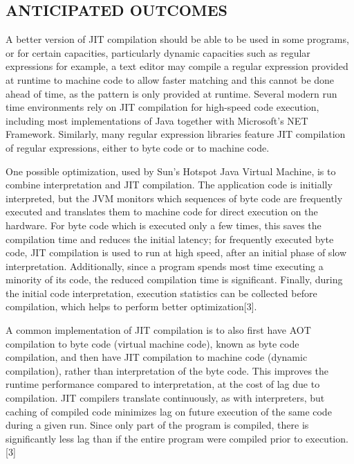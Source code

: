 \documentclass{article}
\begin{document}
\subsection{ANTICIPATED OUTCOMES}{A better version of JIT compilation should be able to be used in some programs, or for certain capacities, particularly dynamic capacities such as regular expressions for example, a text editor may compile a regular expression provided at runtime to machine code to allow faster matching and this cannot be done ahead of time, as the pattern is only provided at runtime. Several modern run time environments rely on JIT compilation for high-speed code execution, including most implementations of Java together with Microsoft’s NET Framework. Similarly, many regular expression libraries feature JIT compilation of regular expressions, either to byte code or to machine code.
 
One possible optimization, used by Sun's Hotspot Java Virtual Machine, is to combine interpretation and JIT compilation. The application code is initially interpreted, but the JVM monitors which sequences of byte code are frequently executed and translates them to machine code for direct execution on the hardware. For byte code which is executed only a few times, this saves the compilation time and reduces the initial latency; for frequently executed byte code, JIT compilation is used to run at high speed, after an initial phase of slow interpretation. Additionally, since a program spends most time executing a minority of its code, the reduced compilation time is significant. Finally, during the initial code interpretation, execution statistics can be collected before compilation, which helps to perform better optimization[3].
 
A common implementation of JIT compilation is to also first have AOT compilation to byte code (virtual machine code), known as byte code compilation, and then have JIT compilation to machine code (dynamic compilation), rather than interpretation of the byte code. This improves the runtime performance compared to interpretation, at the cost of lag due to compilation. JIT compilers translate continuously, as with interpreters, but caching of compiled code minimizes lag on future execution of the same code during a given run. Since only part of the program is compiled, there is significantly less lag than if the entire program were compiled prior to execution. [3]
}
\end{document}
